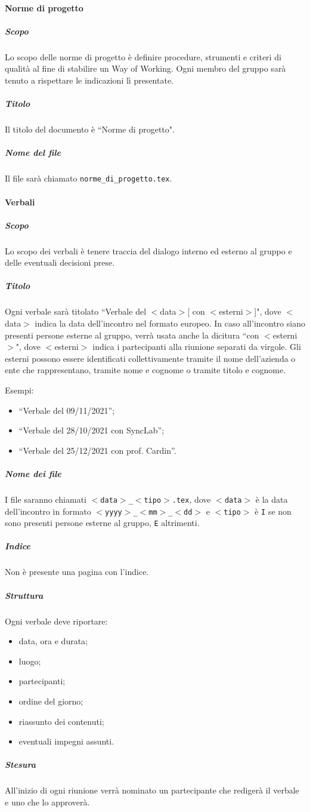 \documentclass[a4paper, 12pt]{article}
\begin{document}
\paragraph{Norme di progetto}
\subparagraph{Scopo}
Lo scopo delle norme di progetto è definire procedure, strumenti e criteri di qualità al fine di stabilire un Way of Working. Ogni membro del gruppo sarà tenuto a rispettare le indicazioni lì presentate.
\subparagraph{Titolo}
Il titolo del documento è ``Norme di progetto".
\subparagraph{Nome del file}
Il file sarà chiamato \texttt{norme\_di\_progetto.tex}.

\paragraph{Verbali}
\subparagraph{Scopo}
Lo scopo dei verbali è tenere traccia del dialogo interno ed esterno al gruppo e delle eventuali decisioni prese.
\subparagraph{Titolo}
Ogni verbale sarà titolato ``Verbale del $<$data$>$[ con $<$esterni$>$]", dove $<$data$>$ indica la data dell'incontro nel formato europeo. In caso all'incontro siano presenti persone esterne al gruppo, verrà usata anche la dicitura ``con $<$esterni$>$", dove $<$esterni$>$ indica i partecipanti alla riunione separati da virgole. Gli esterni possono essere identificati collettivamente tramite il nome dell'azienda o ente che rappresentano, tramite nome e cognome o tramite titolo e cognome.

Esempi:
\begin{itemize}
\item ``Verbale del 09/11/2021'';
\item ``Verbale del 28/10/2021 con SyncLab'';
\item ``Verbale del 25/12/2021 con prof. Cardin''.
\end{itemize}
\subparagraph{Nome dei file}
I file saranno chiamati \texttt{$<$data$>$\_$<$tipo$>$.tex}, dove \texttt{$<$data$>$} è la data dell'incontro in formato \texttt{$<$yyyy$>$\_$<$mm$>$\_$<$dd$>$} e \texttt{$<$tipo$>$} è \texttt{I} se non sono presenti persone esterne al gruppo, \texttt{E} altrimenti.
\subparagraph{Indice}
Non è presente una pagina con l'indice.
\subparagraph{Struttura}
Ogni verbale deve riportare:
\begin{itemize}
\item data, ora e durata;
\item luogo;
\item partecipanti;
\item ordine del giorno;
\item riassunto dei contenuti;
\item eventuali impegni assunti.
\end{itemize}
\subparagraph{Stesura}\label{documentazione-documenti-verbali-stesura}
All'inizio di ogni riunione verrà nominato un partecipante che redigerà il verbale e uno che lo approverà.
\end{document}
